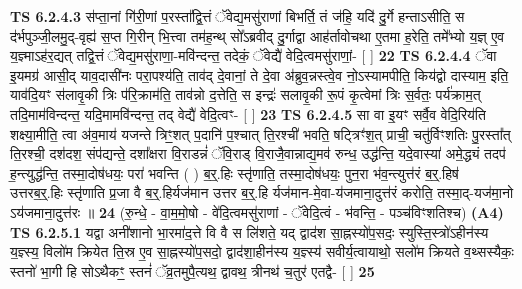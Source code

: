 \documentclass[17pt]{extarticle}
\begin{document}
                  \newline
                                \textbf{ TS 6.2.4.3} \newline
                  स॑प्ता॒नां गि॑री॒णां प॒रस्ता᳚द्वि॒त्तं ॅवेद्य॒मसु॑राणां बिभर्ति॒ तं ज॑हि॒ यदि॑ दु॒र्गे हन्ताऽसीति॒ स द॑र्भपुञ्जी॒लमु॒द्-वृह्य॑ स॒प्त गि॒रीन् भि॒त्त्वा तम॑ह॒न्थ् सो᳚ऽब्रवीद् दु॒र्गाद्वा आह॑र्तावोचथा ए॒तमा ह॒रेति॒ तमे᳚भ्यो य॒ज्ञ् ए॒व य॒ज्ञ्माऽह॑र॒द्यत् तद्वि॒त्तं ॅवेद्य॒मसु॑राणा॒-मवि॑न्दन्त॒ तदेकं॒ ॅवेद्यै॑ वेदि॒त्वमसु॑राणां॒- [  ] \textbf{  22} \newline
                  \newline
                                \textbf{ TS 6.2.4.4} \newline
                  ॅवा इ॒यमग्र॑ आसी॒द् याव॒दासी॑नः परा॒पश्य॑ति॒ ताव॑द् दे॒वानां॒ ते दे॒वा अ॑ब्रुव॒न्नस्त्वे॒व नो॒ऽस्यामपीति॒ किय॑द्वो दास्याम॒ इति॒ याव॑दि॒यꣳ स॑लावृ॒की त्रिः प॑रि॒क्राम॑ति॒ ताव॑न्नो द॒त्तेति॒ स इन्द्रः॑ सलावृ॒की रू॒पं कृ॒त्वेमां त्रिः स॒र्वतः॒ पर्य॑क्राम॒त् तदि॒माम॑विन्दन्त॒ यदि॒मामवि॑न्दन्त॒ तद् वेद्यै॑ वेदि॒त्वꣳ- [  ] \textbf{  23} \newline
                  \newline
                                \textbf{ TS 6.2.4.5} \newline
                  सा वा इ॒यꣳ सर्वै॒व वेदि॒रिय॑ति शक्ष्या॒मीति॒ त्वा अ॑व॒माय॑ यजन्ते त्रिꣳ॒॒शत् प॒दानि॑ प॒श्चात् ति॒रश्ची॑ भवति॒ षट्त्रिꣳ॑श॒त् प्राची॒ चतु॑र्विꣳशतिः पु॒रस्ता᳚त् ति॒रश्ची॒ दश॑दश॒ संप॑द्यन्ते॒ दशा᳚क्षरा वि॒राडन्नं॑ ॅवि॒राड् वि॒राजै॒वान्नाद्य॒मव॑ रुन्ध॒ उद्ध॑न्ति॒ यदे॒वास्या॑ अमे॒द्ध्यं तदप॑ ह॒न्त्युद्ध॑न्ति॒ तस्मा॒दोष॑धयः॒ परा॑ भवन्ति ( ) ब॒र्॒.हिः स्तृ॑णाति॒ तस्मा॒दोष॑धयः॒ पुन॒रा भ॑व॒न्त्युत्त॑रं ब॒र्॒.हिष॑ उत्तरब॒र्॒.हिः स्तृ॑णाति प्र॒जा वै ब॒र्॒.हिर्यज॑मान उत्तर ब॒र्॒.हि र्यज॑मान-मे॒वा-य॑जमाना॒दुत्त॑रं करोति॒ तस्मा॒द्-यज॑मा॒नो ऽय॑जमाना॒दुत्त॑रः ॥ \textbf{  24} \newline
                  \newline
                      (रु॒न्धे॒ - वा॒म॒मो॒षो - वे॑दि॒त्वमसु॑राणां - ॅवेदि॒त्वं - भ॑वन्ति॒ - पञ्च॑विꣳशतिश्च)  \textbf{(A4)} \newline \newline
                                        \textbf{ TS 6.2.5.1} \newline
                  यद्वा अनी॑शानो भा॒रमा॑द॒त्ते वि वै स लि॑शते॒ यद् द्वाद॑श सा॒ह्नस्यो॑प॒सदः॒ स्युस्ति॒स्त्रो॑ऽहीन॑स्य य॒ज्ञ्स्य॒ विलो॑म क्रियेत ति॒स्र ए॒व सा॒ह्नस्यो॑प॒सदो॒ द्वाद॑शा॒हीन॑स्य य॒ज्ञ्स्य॑ सवीर्य॒त्वायाथो॒ सलो॑म क्रियते व॒थ्सस्यैकः॒ स्तनो॑ भा॒गी हि सोऽथैकꣳ॒॒ स्तनं॑ ॅव्र॒तमुपै॒त्यथ॒ द्वावथ॒ त्रीनथ॑ च॒तुर॑ एतद्वै- [  ] \textbf{  25} \newline
\end{document}
